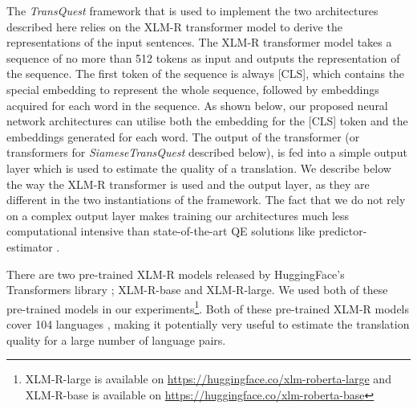 The \textit{TransQuest} framework that is used to implement the two architectures described here relies on the XLM-R transformer model \autocite{conneau-etal-2020-unsupervised} to derive the representations of the input sentences. The XLM-R transformer model takes a sequence of no more than 512 tokens as input and outputs the representation of the sequence. The first token of the sequence is always \textsc{[CLS]}, which contains the special embedding to represent the whole sequence, followed by embeddings acquired for each word in the sequence. As shown below, our proposed neural network architectures can utilise both the embedding for the \textsc{[CLS]} token and the embeddings generated for each word. The output of the transformer (or transformers for \textit{SiameseTransQuest} described below), is fed into a simple output layer which is used to estimate the quality of a translation. We describe below the way the XLM-R transformer is used and the output layer, as they are different in the two instantiations of the framework. The fact that we do not rely on a complex output layer makes training our architectures much less computational intensive than state-of-the-art QE solutions like predictor-estimator \autocite{lee-2020-two, wang-etal-2018-alibaba}.

There are two pre-trained XLM-R models released by HuggingFace's Transformers library \autocite{wolf-etal-2020-transformers}; XLM-R-base and XLM-R-large. We used both of these pre-trained models in our experiments\footnote{XLM-R-large is available on \url{https://huggingface.co/xlm-roberta-large} and XLM-R-base is available on \url{https://huggingface.co/xlm-roberta-base}}. Both of these pre-trained XLM-R models cover 104 languages \autocite{conneau-etal-2020-unsupervised}, making it potentially very useful to estimate the translation quality for a large number of language pairs.

